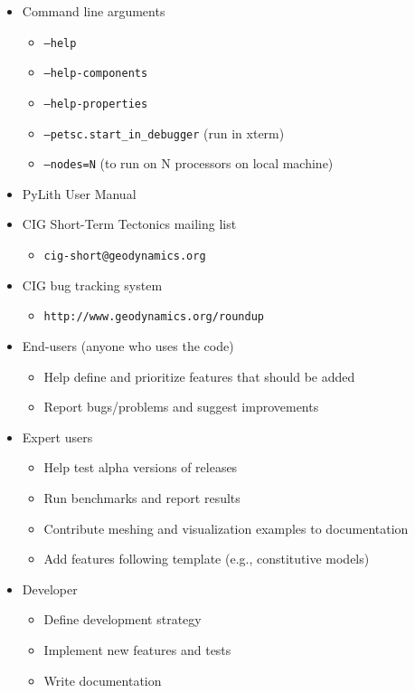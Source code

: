\documentclass[pdftex,cig,slideColor]{pp4slides}
\begin{document}
  \summary{}

  \begin{itemize}
  \item Command line arguments
    \begin{itemize}
    \item {\tt --help}
    \item {\tt --help-components}
    \item {\tt --help-properties}
    \item {\tt --petsc.start\_in\_debugger} (run in xterm)
    \item {\tt --nodes=N} (to run on N processors on local machine)
    \end{itemize}
  \item PyLith User Manual
  \item CIG Short-Term Tectonics mailing list
    \begin{itemize}
    \item {\tt cig-short@geodynamics.org}
    \end{itemize}
  \item CIG bug tracking system
    \begin{itemize}
    \item {\tt http://www.geodynamics.org/roundup}
    \end{itemize}
  \end{itemize}


  \begin{itemize}
  \item End-users (anyone who uses the code)
    \begin{itemize}
    \item Help define and prioritize features that should be added
    \item Report bugs/problems and suggest improvements
    \end{itemize}
  \item Expert users
    \begin{itemize}
    \item Help test alpha versions of releases
    \item Run benchmarks and report results
    \item Contribute meshing and visualization examples to documentation
    \item Add features following template (e.g., constitutive models)
    \end{itemize}
  \item Developer
    \begin{itemize}
    \item Define development strategy 
    \item Implement new features and tests
    \item Write documentation
    \end{itemize}
  \end{itemize}
\end{document}

